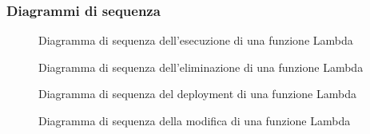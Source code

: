 \subsubsection{Diagrammi di sequenza}
\begin{figure}[!h]
	\noindent
	\caption{Diagramma di sequenza dell'esecuzione di una funzione Lambda}
\end{figure}
\begin{figure}[!h]
	\noindent
	\caption{Diagramma di sequenza dell'eliminazione di una funzione Lambda}
\end{figure}
\begin{figure}[!h]
	\noindent
	\caption{Diagramma di sequenza del deployment di una funzione Lambda}
\end{figure}
\begin{figure}[!h]
	\noindent
	\caption{Diagramma di sequenza della modifica di una funzione Lambda}
\end{figure}


